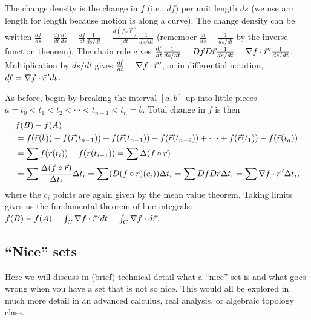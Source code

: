 The change density is the change in $f$ (i.e., $df$) per unit length
$ds$ (we use arc length for length because motion is along a
curve). The change density can be written $\frac{d f}{d s} = \frac
{df}{dt} \frac{dt}{ds}=\frac {df}{dt} \frac{1}{ds/dt}=\frac{d(f\circ \vec
  r)}{dt}\frac{1}{ds/dt}$ (remember $\frac {dt}{ds}=\frac{1}{ds/dt}$
by the inverse function theorem). The chain rule gives
$\frac{df}{dt}\frac 1 {ds/dt} = Df D\vec r \frac{1}{ds/dt} = \nabla f \cdot
\vec r^{\,\prime} \frac{1}{ds/dt}$. Multiplication by $ds/dt$ gives
$\frac{df}{dt} = \nabla f \cdot \vec r^{\,\prime}$, or in differential notation, $df = \nabla
f \cdot \vec r^{\,\prime} dt$.

As before, begin by breaking the interval $[a,b]$ up into little
pieces {$ a=t_0<t_1<t_2<\cdots <t_{n-1}<t_n=b $}.  Total change in $f$ is
then
\begin{align*}
&f(B)-f(A) \\
&= f(\vec r(b))-f(\vec r(t_{n-1})) + f(\vec r(t_{n-1}))-f(\vec
r(t_{n-2})) +\cdots + f(\vec r(t_{1}))-f(\vec r(t_{a})) \\
&= \sum f(\vec r(t_i)) - f(\vec r(t_{i-1})) 
= \sum\Delta (f\circ\vec r) \\
&= \sum\frac{\Delta(f\circ \vec r)}{ \Delta t_i}\Delta t_i  
= \sum (D(f\circ \vec r)(c_i)) \Delta t_i 
= \sum DfD\vec r \Delta t_i 
= \sum \nabla f\cdot \vec r^{\,\prime} \Delta t_i, 
\end{align*}
where the $c_i$ points are again given by the mean value theorem.  Taking
limits gives us the fundamental theorem of line integrals: $
f(B)-f(A)= \int_C \nabla f\cdot \vec r^{\,\prime} dt = \int_C\nabla f\cdot d\vec r $.

\subsection{``Nice'' sets}
\label{sec:nice-sets}



Here we will discuss in (brief) technical detail what a ``nice'' set
is and what goes wrong when you have a set that is not so nice.  This
would all be explored in much more detail in an advanced calculus, real
analysis, or algebraic topology class.


